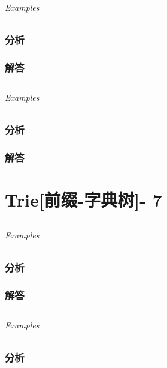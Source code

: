 \documentclass[UTF8,a4paper,12pt]{ctexbook}
\begin{document}
	\subparagraph{Examples}
	
	\subsection{分析}
	
	\subsection{解答}
	
\section{}
	
	\subparagraph{Examples}
	
	\subsection{分析}
	
	\subsection{解答}
\chapter{Trie[前缀-字典树]- 7}
\section{}
	
	\subparagraph{Examples}
	
	\subsection{分析}
	
	\subsection{解答}
	
\section{}
	
	\subparagraph{Examples}
	
	\subsection{分析}
	
\end{document}
